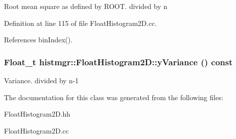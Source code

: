 Root mean square as defined by ROOT. divided by n 

Definition at line 115 of file FloatHistogram2D.cc.

References binIndex().
\subsubsection[{yVariance}]{\setlength{\rightskip}{0pt plus 5cm}Float\_\-t histmgr::FloatHistogram2D::yVariance () const}\label{classhistmgr_1_1FloatHistogram2D_a35e14860e0bd3e2b0370419122f43554}


Variance. divided by n-\/1 

The documentation for this class was generated from the following files:\begin{DoxyCompactItemize}
\item 
FloatHistogram2D.hh\item 
FloatHistogram2D.cc\end{DoxyCompactItemize}
